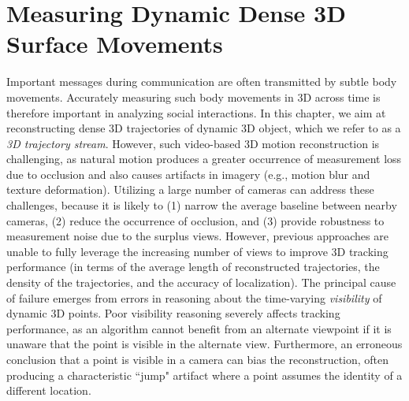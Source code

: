 


\chapter{Measuring Dynamic Dense 3D Surface Movements}
\label{chapter:trajectory}

Important messages during communication are often transmitted by subtle body movements. Accurately measuring such body movements in 3D across time is therefore important in analyzing social interactions. In this chapter, we aim at reconstructing dense 3D trajectories of dynamic 3D object, which we refer to as a \emph{3D trajectory stream}. However, such video-based 3D motion reconstruction is challenging, as natural motion produces a greater occurrence of measurement loss due to occlusion and also causes artifacts in imagery (e.g., motion blur and texture deformation). Utilizing a large number of cameras can address these challenges, because it is likely to (1) narrow the average baseline between nearby cameras, (2) reduce the occurrence of occlusion, and (3) provide robustness to measurement noise due to the surplus views. However, previous approaches are unable to fully leverage the increasing number of views to improve 3D tracking performance (in terms of the average length of reconstructed trajectories, the density of the trajectories, and the accuracy of localization). The principal cause of failure emerges from errors in reasoning about the time-varying \emph{visibility} of dynamic 3D points. Poor visibility reasoning severely affects tracking performance, as an algorithm cannot benefit from an alternate viewpoint if it is unaware that the point is visible in the alternate view. Furthermore, an erroneous conclusion that a point is visible in a camera can bias the reconstruction, often producing a characteristic ``jump" artifact where a point assumes the identity of a different location.





